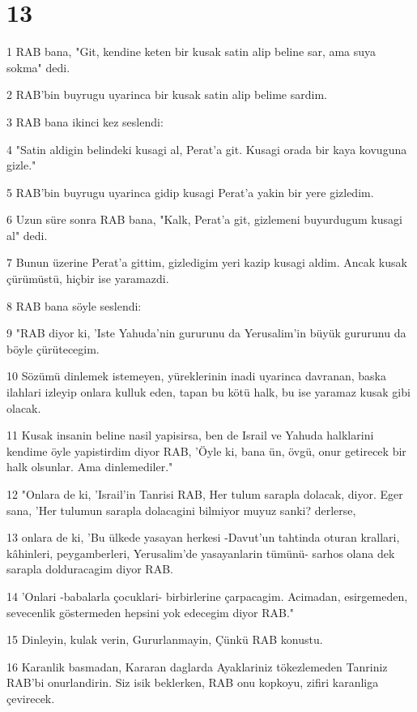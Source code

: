 \chapter{13}

\par 1 RAB bana, "Git, kendine keten bir kusak satin alip beline sar, ama suya sokma" dedi.
\par 2 RAB'bin buyrugu uyarinca bir kusak satin alip belime sardim.
\par 3 RAB bana ikinci kez seslendi:
\par 4 "Satin aldigin belindeki kusagi al, Perat'a git. Kusagi orada bir kaya kovuguna gizle."
\par 5 RAB'bin buyrugu uyarinca gidip kusagi Perat'a yakin bir yere gizledim.
\par 6 Uzun süre sonra RAB bana, "Kalk, Perat'a git, gizlemeni buyurdugum kusagi al" dedi.
\par 7 Bunun üzerine Perat'a gittim, gizledigim yeri kazip kusagi aldim. Ancak kusak çürümüstü, hiçbir ise yaramazdi.
\par 8 RAB bana söyle seslendi:
\par 9 "RAB diyor ki, 'Iste Yahuda'nin gururunu da Yerusalim'in büyük gururunu da böyle çürütecegim.
\par 10 Sözümü dinlemek istemeyen, yüreklerinin inadi uyarinca davranan, baska ilahlari izleyip onlara kulluk eden, tapan bu kötü halk, bu ise yaramaz kusak gibi olacak.
\par 11 Kusak insanin beline nasil yapisirsa, ben de Israil ve Yahuda halklarini kendime öyle yapistirdim diyor RAB, 'Öyle ki, bana ün, övgü, onur getirecek bir halk olsunlar. Ama dinlemediler."
\par 12 "Onlara de ki, 'Israil'in Tanrisi RAB, Her tulum sarapla dolacak, diyor. Eger sana, 'Her tulumun sarapla dolacagini bilmiyor muyuz sanki? derlerse,
\par 13 onlara de ki, 'Bu ülkede yasayan herkesi -Davut'un tahtinda oturan krallari, kâhinleri, peygamberleri, Yerusalim'de yasayanlarin tümünü- sarhos olana dek sarapla dolduracagim diyor RAB.
\par 14 'Onlari -babalarla çocuklari- birbirlerine çarpacagim. Acimadan, esirgemeden, sevecenlik göstermeden hepsini yok edecegim diyor RAB."
\par 15 Dinleyin, kulak verin, Gururlanmayin, Çünkü RAB konustu.
\par 16 Karanlik basmadan, Kararan daglarda Ayaklariniz tökezlemeden Tanriniz RAB'bi onurlandirin. Siz isik beklerken, RAB onu kopkoyu, zifiri karanliga çevirecek.
